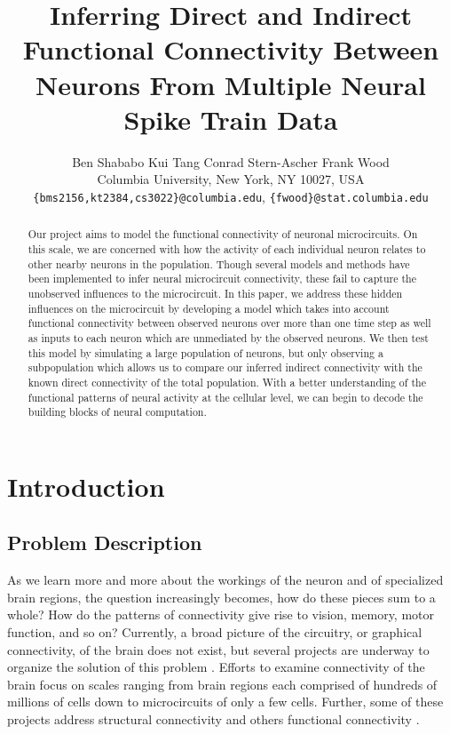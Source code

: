 \documentclass{article}
\title{Inferring Direct and Indirect Functional Connectivity Between Neurons From Multiple Neural Spike Train Data}
\author{
Ben Shababo \hspace{1cm} Kui Tang \hspace{1 cm}Conrad Stern-Ascher \hspace{1cm}Frank Wood\\
Columbia University, New York, NY 10027, USA \\
\texttt{\{bms2156,kt2384,cs3022\}@columbia.edu},
\texttt{\{fwood\}@stat.columbia.edu} 
}
\begin{document}
\maketitle

\begin{abstract}
Our project aims to model the functional connectivity of neuronal
microcircuits. On this scale, we are concerned with how the activity
of each individual neuron relates to other nearby neurons in the
population. Though several models and methods have been implemented to infer neural microcircuit connectivity, these fail to capture the unobserved influences to the microcircuit. In this paper, we address these hidden influences on the microcircuit by developing a model which takes into account functional connectivity between observed neurons over more than one time step as well as inputs to each neuron which are unmediated by the observed neurons. We then test this model by simulating a large population of neurons, but only observing a subpopulation which allows us to compare our inferred indirect connectivity with the known direct connectivity of the total population. With a better understanding of the functional patterns of neural
activity at the cellular level, we can begin to decode the building
blocks of neural computation.
\end{abstract}

\section{Introduction}
\label{sec:introduction}

\subsection{Problem Description}

As we learn more and more about the workings of the neuron and of
specialized brain regions, the question increasingly becomes, how
do these pieces sum to a whole? How do the patterns of connectivity
give rise to vision, memory, motor function, and so on? Currently, a broad picture of the circuitry, or graphical connectivity,
of the brain does not exist, but several projects are underway to organize the solution of
this problem \citep{Marcus2011, Bohland2009}. Efforts to examine connectivity of the brain focus on scales ranging from brain regions each comprised of hundreds of
millions of cells down to microcircuits of only a few cells. Further,
some of these projects address structural connectivity and others
functional connectivity \citep{KnowlesBarley2011, Jain2010, Ropireddy2011, Chiang2011, bhattacharya2006}.
\end{document}
